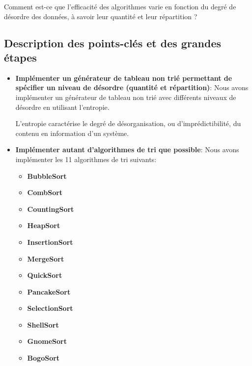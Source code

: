 \documentclass[10pt,a4paper]{article}
\begin{document}
    Comment est-ce que l'efficacité des algorithmes varie en fonction du degré de désordre des données, à savoir leur quantité et leur répartition ?
    
    \subsection{Description des points-clés et des grandes étapes}

        \begin{itemize}
            \item \textbf{Implémenter un générateur de tableau non trié permettant de spécifier un niveau de désordre (quantité et répartition)}: Nous avons implémenter un générateur de tableau non trié avec différents niveaux de désordre en utilisant l'entropie.
                
            L'entropie caractérise le degré de désorganisation, ou d'imprédictibilité, du contenu en information d'un système.
            
            \item \textbf{Implémenter autant d'algorithmes de tri que possible}: Nous avons implémenter les 11 algorithmes de tri suivants:
            
 
            \begin{multicols}{2}{
                \begin{itemize}  
                    \item \textbf{BubbleSort}
                    \item \textbf{CombSort}
                    \item \textbf{CountingSort}
                    \item \textbf{HeapSort}
                    \item \textbf{InsertionSort}
                    \item \textbf{MergeSort}
                \end{itemize} 
             
                \begin{itemize}  
                    \item \textbf{QuickSort}
                    \item \textbf{PancakeSort}
                    \item \textbf{SelectionSort}
                    \item \textbf{ShellSort}
                    \item \textbf{GnomeSort} 
                    \item \textbf{BogoSort}
                \end{itemize}
            }
            \end{multicols}


\end{itemize}
\end{document}
